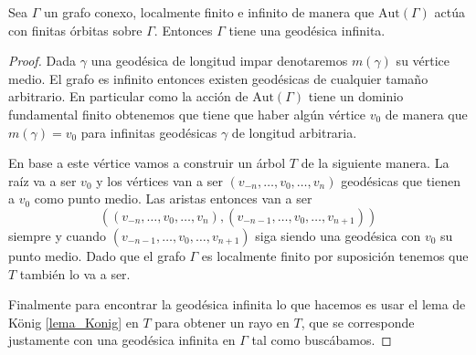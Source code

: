 \documentclass[tesis.tex]{subfiles}
\newcommand{\aut}{\text{Aut}}
\begin{document}
\begin{lema}\label{lema_geodesica_biinfinita}
	Sea $\Gamma$ un grafo conexo, localmente finito e infinito de manera que $\aut(\Gamma)$ actúa con finitas órbitas sobre $\Gamma$.
	Entonces $\Gamma$ tiene una geodésica infinita.
\end{lema}
\begin{proof}
	Dada $\gamma$ una geodésica de longitud impar denotaremos $m(\gamma)$ su vértice medio.	
	El grafo es infinito entonces existen geodésicas de cualquier tamaño arbitrario.
	En particular como la acción de $\aut(\Gamma)$ tiene un dominio fundamental finito obtenemos que tiene que haber algún vértice $v_0$ de manera que $m(\gamma) = v_0$ para infinitas geodésicas $\gamma$ de longitud arbitraria.
	
	En base a este vértice vamos a construir un árbol $T$ de la siguiente manera.
	La raíz va a ser $v_0$ y los vértices van a ser $(v_{-n},\dots, v_0,\dots,v_n)$ geodésicas que tienen a $v_0$ como punto medio.
	Las aristas entonces van a ser 
	\[
		((v_{-n},\dots, v_0,\dots,v_n), (v_{-n-1},\dots, v_0,\dots,v_{n+1}))
	\]
	siempre y cuando $(v_{-n-1},\dots, v_0,\dots,v_{n+1})$ siga siendo una geodésica con $v_0$ su punto medio.
	Dado que el grafo $\Gamma$ es localmente finito por suposición tenemos que $T$ también lo va a ser.
	
	Finalmente para encontrar la geodésica infinita lo que hacemos es usar el lema de König \ref{lema_Konig} en $T$ para obtener un rayo en $T$, que se corresponde justamente con una geodésica infinita en $\Gamma$ tal como buscábamos.
	
\end{proof}
\end{document}
